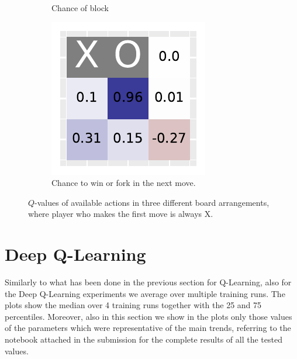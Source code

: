 \documentclass[10pt]{IEEEtran}
\begin{document}
\begin{figure}[h]
\begin{subfigure}[t]{0.32\linewidth}
         \caption{Chance of block}
         \label{fig_heatmap_2}
     \end{subfigure}
     \hfill
     \begin{subfigure}[t]{0.32\linewidth}
         \centering
         \includegraphics[width=\linewidth]{code/figures/heatmap_2.pdf}
         \caption{Chance to win or fork in the next move.}
         \label{fig_heatmap_3}
     \end{subfigure}
        \caption{$Q$-values of available actions in three different board arrangements, where player who makes the first move is always X.}
        \label{plot_question_10}
\end{figure}

\section{Deep Q-Learning}
Similarly to what has been done in the previous section for Q-Learning, also for the Deep Q-Learning experiments we average over multiple training runs. The plots show the median over 4 training runs together with the 25 and 75 percentiles. Moreover, also in this section we show in the plots only those values of the parameters which were representative of the main trends, referring to the notebook attached in the submission for the complete results of all the tested values.
\end{document}
